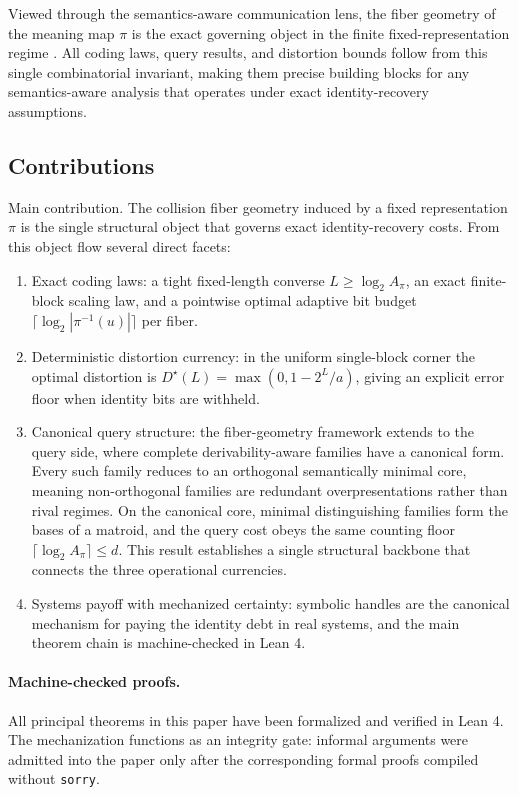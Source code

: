 Viewed through the semantics-aware communication lens, the fiber geometry of the meaning map $\pi$ is the exact governing object in the finite fixed-representation regime \cite{gunduz2023beyond}. All coding laws, query results, and distortion bounds follow from this single combinatorial invariant, making them precise building blocks for any semantics-aware analysis that operates under exact identity-recovery assumptions.

\subsection{Contributions}

Main contribution. The collision fiber geometry induced by a fixed representation $\pi$ is the single structural object that governs exact identity-recovery costs. From this object flow several direct facets:

\begin{enumerate}
\item Exact coding laws: a tight fixed-length converse $L \ge \log_2 A_{\pi}$, an exact finite-block scaling law, and a pointwise optimal adaptive bit budget $\lceil \log_2 |\pi^{-1}(u)|\rceil$ per fiber.
\item Deterministic distortion currency: in the uniform single-block corner the optimal distortion is $D^\star(L)=\max(0,1-2^L/a)$, giving an explicit error floor when identity bits are withheld.
\item Canonical query structure: the fiber-geometry framework extends to the query side, where complete derivability-aware families have a canonical form. Every such family reduces to an orthogonal semantically minimal core, meaning non-orthogonal families are redundant overpresentations rather than rival regimes. On the canonical core, minimal distinguishing families form the bases of a matroid, and the query cost obeys the same counting floor $\lceil \log_2 A_{\pi}\rceil \le d$. This result establishes a single structural backbone that connects the three operational currencies.
\item Systems payoff with mechanized certainty: symbolic handles are the canonical mechanism for paying the identity debt in real systems, and the main theorem chain is machine-checked in Lean 4.
\end{enumerate}

\paragraph{Machine-checked proofs.}
All principal theorems in this paper have been formalized and verified in Lean 4. The mechanization functions as an integrity gate: informal arguments were admitted into the paper only after the corresponding formal proofs compiled without \texttt{sorry}.

